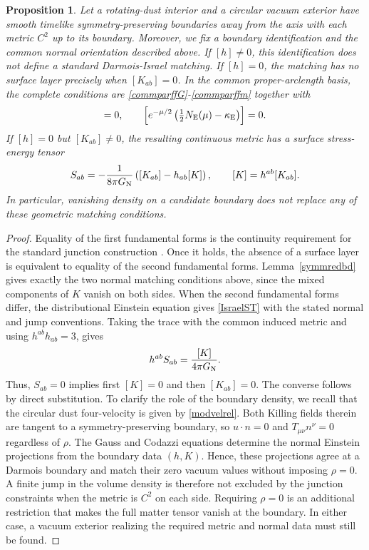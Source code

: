\documentclass[amsmath,amsfonts,amssymb,aps,pra,superscriptaddress,10pt]{revtex4-2}
\numberwithin{equation}{section}
\theoremstyle{plain}
\newtheorem{proposition}{Proposition}
\theoremstyle{definition}
\theoremstyle{remark}
\theoremstyle{definition}
\begin{document}
\begin{proposition}
Let a rotating-dust interior and a circular vacuum exterior have smooth timelike symmetry-preserving boundaries away from the axis with each metric $C^2$ up to its boundary. Moreover, we fix a boundary identification and the common normal orientation described above. If $[h]\neq 0$, this identification does not define a standard Darmois-Israel matching. If $[h]=0$, the matching has no surface layer precisely when $[K_{ab}]=0$. In the common proper-arclength basis, the complete conditions are \eqref{commparffG}-\eqref{commparffm} together with
\begin{equation}
[n^\nu\partial_{\nu}G_{AB}]=0,\qquad
\left[e^{-\mu/2}\left(\tfrac12N_{\rm E}(\mu)-\kappa_{\rm E}\right)\right]
=0.
\end{equation}
If $[h]=0$ but $[K_{ab}]\neq 0$, the resulting continuous metric has a surface stress-energy tensor
\begin{equation}\label{IsraelST}
S_{ab}=-\frac1{8\pi G_{\rm{N}}}
\left([K_{ab}]-h_{ab}[K]\right),\qquad 
[K]=h^{ab}[K_{ab}].
\end{equation}
In particular, vanishing density on a candidate boundary does not replace any of these geometric matching conditions.
\end{proposition}

\begin{proof}
Equality of the first fundamental forms is the continuity requirement for the standard junction construction \cite{Darmois1927,Israel1966NCB,MarsSenovilla1993CQG}. Once it holds, the absence of a surface layer is equivalent to equality of the second fundamental forms. Lemma~\ref{symmredbd} gives exactly the two normal matching conditions above, since the mixed components of $K$ vanish on both sides. When the second fundamental forms differ, the distributional Einstein equation gives \eqref{IsraelST} with the stated normal and jump conventions. Taking the trace with the common induced metric and using $h^{ab}h_{ab}=3$, gives
\begin{equation}
h^{ab}S_{ab}=\frac{[K]}{4\pi G_{\rm{N}}}.
\end{equation}
Thus, $S_{ab}=0$ implies first $[K]=0$ and then $[K_{ab}]=0$. The converse follows by direct substitution. To clarify the role of the boundary density, we recall that the circular dust four-velocity is given by \eqref{modvelrel}. Both Killing fields therein are tangent to a symmetry-preserving boundary, so $u\cdot n=0$ and $T_{\mu\nu}n^\nu=0$ regardless of $\rho$. The Gauss and Codazzi equations determine the normal Einstein projections from the boundary data $(h,K)$. Hence, these projections agree at a Darmois boundary and match their zero vacuum values without imposing $\rho=0$. A finite jump in the volume density is therefore not excluded by the junction constraints when the metric is $C^2$ on each side. Requiring $\rho=0$ is an additional restriction that makes the full matter tensor vanish at the boundary. In either case, a vacuum exterior realizing the required metric and normal data must still be found.
\end{proof}
\end{document}

